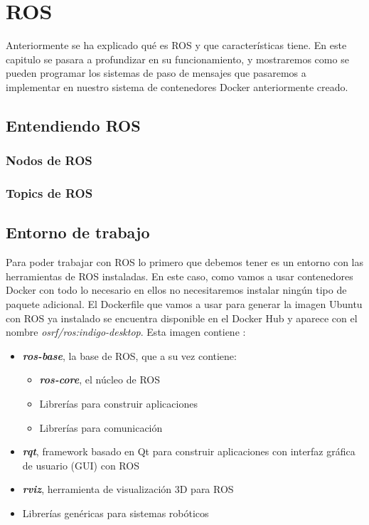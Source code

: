 \chapter{ROS}
Anteriormente se ha explicado qué es ROS y que características tiene. En este capitulo se pasara a profundizar en su funcionamiento, y mostraremos como se pueden programar los sistemas de paso de mensajes que pasaremos a implementar en nuestro sistema de contenedores Docker anteriormente creado.

	\section{Entendiendo ROS}
		
		\subsection{Nodos de ROS}
		
		\subsection{Topics de ROS}
	
	\section{Entorno de trabajo}
	Para poder trabajar con ROS lo primero que debemos tener es un entorno con las herramientas de ROS instaladas. En este caso, como vamos a usar contenedores Docker con todo lo necesario en ellos no necesitaremos instalar ningún tipo de paquete adicional. El Dockerfile que vamos a usar para generar la imagen Ubuntu con ROS ya instalado se encuentra disponible en el Docker Hub y aparece con el nombre \emph{osrf/ros:indigo-desktop}. Esta imagen contiene \cite{ros-installation}:
	\begin{itemize}
		\item \emph{\textbf{ros-base}}, la base de ROS, que a su vez contiene:
		\begin{itemize}
			\item \emph{\textbf{ros-core}}, el núcleo de ROS
			\item Librerías para construir aplicaciones
			\item Librerías para comunicación
		\end{itemize}
		\item \emph{\textbf{rqt}}, framework basado en Qt para construir aplicaciones con interfaz gráfica de usuario (GUI) con ROS
		\item \emph{\textbf{rviz}}, herramienta de visualización 3D para ROS
		\item Librerías genéricas para sistemas robóticos
		
	\end{itemize}
	

